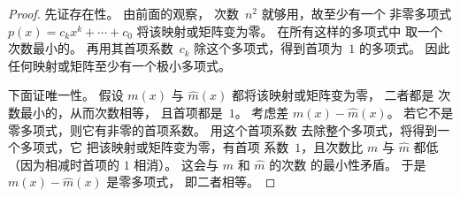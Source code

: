 \begin{proof}
先证存在性。
由前面的观察，
次数~$n^2$ 就够用，故至少有一个
非零多项式 $p(x)=c_kx^k+\cdots+c_0$
将该映射或矩阵变为零。
在所有这样的多项式中
取一个次数最小的。
再用其首项系数~$c_k$ 除这个多项式，得到首项为~$1$ 的多项式。
因此任何映射或矩阵至少有一个极小多项式。

下面证唯一性。
假设
\( m(x) \) 与 \( \hat{m}(x) \) 都将该映射或矩阵变为零，
二者都是
次数最小的，从而次数相等，
且首项都是~$1$。
考虑差 \( m(x)-\hat{m}(x) \)。
若它不是零多项式，则它有非零的首项系数。
用这个首项系数
去除整个多项式，将得到一个多项式，它
把该映射或矩阵变为零，有首项
系数~\( 1\)，且次数比
$m$ 与 $\hat{m}$ 都低
（因为相减时首项的 \( 1\) 相消）。
这会与 $m$ 和 $\hat{m}$ 的次数
的最小性矛盾。
于是 \( m(x)-\hat{m}(x) \) 是零多项式，
即二者相等。
\end{proof}

